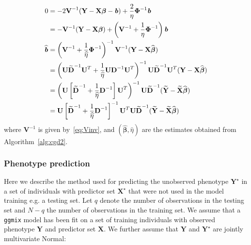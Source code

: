 \documentclass[12pt,letter]{article}\usepackage[]{graphicx}\usepackage[]{color}
\newcommand{\bX}{\textbf{X}}
\newcommand{\bY}{\textbf{Y}}
\newcommand{\bD}{\textbf{D}}
\newcommand{\bXtilde}{\widetilde{\bX}}
\newcommand{\bYtilde}{\widetilde{\bY}}
\newcommand{\bDtilde}{\widetilde{\bD}}
\newcommand{\bU}{\textbf{U}}
\newcommand{\bV}{\textbf{V}}
\newcommand{\bb}{\textbf{\emph{b}}}
\newcommand{\bbeta}{\boldsymbol{\beta}}
\newcommand{\bPhi}{\boldsymbol{\Phi}}
\begin{document}
\begin{align}
	0 & = -2 \bV^{-1} (\bY - \bX \bbeta - \bb) + \frac{2}{\eta} \bPhi^{-1}\bb \nonumber \\
	& = -\bV^{-1}  (\bY - \bX \bbeta ) + \left(\bV^{-1} + \frac{1}{\eta}\bPhi^{-1}\right) \bb  \nonumber\\
	\widehat{\bb} & = \left(\bV^{-1} + \frac{1}{\widehat{\eta}}\bPhi^{-1}\right)^{-1}\bV^{-1}  (\bY - \bX \widehat{\bbeta} ) \nonumber \\
	& = \left(\bU \bDtilde^{-1} \bU^T + \frac{1}{\widehat{\eta}}\bU \bD^{-1} \bU^T\right)^{-1} \bU \bDtilde^{-1} \bU^T (\bY - \bX \widehat{\bbeta} ) \nonumber \\
	& = \left(\bU \left[\bDtilde^{-1} + \frac{1}{\widehat{\eta}} \bD^{-1} \right] \bU^T \right)^{-1} \bU \bDtilde^{-1} (\bYtilde - \bXtilde \widehat{\bbeta} ) \nonumber \\
	& = \bU \left[\bDtilde^{-1} + \frac{1}{\widehat{\eta}} \bD^{-1} \right]^{-1} \bU^T \bU \bDtilde^{-1} (\bYtilde - \bXtilde \widehat{\bbeta} ) \nonumber
\end{align}
where $\bV^{-1}$ is given by~\eqref{eq:Vinv}, and $(\widehat{\bbeta}, \widehat{\eta})$ are the estimates obtained from Algorithm~\ref{alg:cgd2}.



\subsubsection{Phenotype prediction} \label{phenoprediction}

Here we describe the method used for predicting the unobserved phenotype $\bY^\star$ in a set of individuals with predictor set $\bX^\star$ that were not used in the model training e.g. a testing set. Let $q$ denote the number of observations in the testing set and $N-q$ the number of observations in the training set. We assume that a \texttt{ggmix} model has been fit on a set of training individuals with observed phenotype $\bY$ and predictor set $\bX$.  We further assume that $\bY$ and $\bY^\star$ are jointly multivariate Normal:
\end{document}
